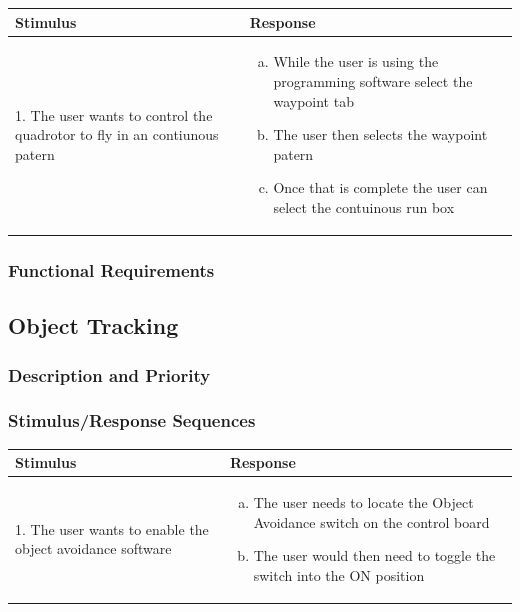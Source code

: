 \documentclass[english]{article}
\numberwithin{equation}{section} %
\begin{document}
\begin{longtable}{p{3cm} | p{10cm}}
\hline
\textbf{Stimulus} & \textbf{Response}\\
\hline
1. The user wants to control the quadrotor to fly in an contiunous patern &
\begin{enumerate}[(a)]\itemsep1pt %
\item While the user is using the programming software select the waypoint tab
\item The user then selects the waypoint patern
\item Once that is complete the user can select the contuinous run box
\end{enumerate}
\\ 
\hline
\end{longtable}



\subsubsection{Functional Requirements}
\bigskip
\subsection{Object Tracking}
\subsubsection{Description and Priority}
\subsubsection{Stimulus/Response Sequences}

\begin{longtable}{p{3cm} | p{10cm}}
\hline
\textbf{Stimulus} & \textbf{Response}\\
\hline
1. The user wants to enable the object avoidance software &
\begin{enumerate}[(a)]\itemsep1pt %
\item The user needs to locate the Object Avoidance switch on the control board
\item The user would then need to toggle the switch into the ON position
\end{enumerate}
\\ 
\hline
\end{longtable}
\end{document}
